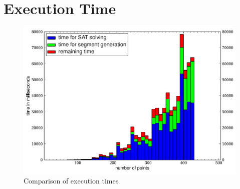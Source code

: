 \section{Execution Time}

\begin{landscape}

\begin{figure}[ht]
  \centering
  \includegraphics[width=\linewidth,height=\textheight,keepaspectratio]{results/time_comparison.pdf}
  \caption{\label{fig:time_comparison}Comparison of execution times}
\end{figure}
\end{landscape}
\restoregeometry

